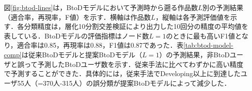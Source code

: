 \documentclass[submit]{ipsj}
\begin{document}
\begin{table}[t]
{\begin{tabular}{r|rp{60mm}|rp{60mm}}
        \end{tabular}
    }
    \vspace{-4mm}
\end{table}

図\ref{fig:btod-lines}は，BtoDモデルにおいて予測時から遡る作品数$L$別の予測結果（適合率，再現率，F値）を示す．横軸は作品数$L$，縦軸は各予測評価値を示す．各分類精度は，層化10分割交差検証により出力した10回分の精度の平均値を表している．BtoDモデルの評価指標はノード数$L=1$のときに最も高いF1値となり，適合率は0.85，再現率は0.88，F1値は0.87であった．表\ref{tab:btod-model-comp}は従来BtoDモデルと提案BtoDモデル（$L=1$）の予測結果，非BtoDユーザと誤って予測したBtoDユーザ数を示す．従来手法に比べてわずかに高い精度で予測することができた．具体的には，従来手法でDeveloping以上に到達したユーザ55人（=370人-315人）の誤分類が提案BtoDモデルによって減少した．\textcolor{red}{}
\end{document}
